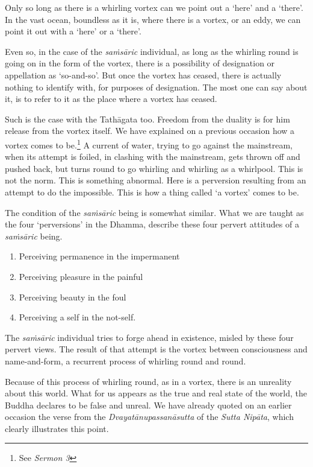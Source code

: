Only so long as there is a whirling vortex can we point out a `here' and a `there'. In the vast ocean, boundless as it is, where there is a vortex, or an eddy, we can point it out with a `here' or a `there'.

Even so, in the case of the \emph{saṁsāric} individual, as long as the whirling round is going on in the form of the vortex, there is a possibility of designation or appellation as `so-and-so'. But once the vortex has ceased, there is actually nothing to identify with, for purposes of designation. The most one can say about it, is to refer to it as the place where a vortex has ceased.

Such is the case with the Tathāgata too. Freedom from the duality is for him release from the vortex itself. We have explained on a previous occasion how a vortex comes to be.\footnote{See \emph{Sermon 3}} A current of water, trying to go against the mainstream, when its attempt is foiled, in clashing with the mainstream, gets thrown off and pushed back, but turns round to go whirling and whirling as a whirlpool. This is not the norm. This is something abnormal. Here is a perversion resulting from an attempt to do the impossible. This is how a thing called `a vortex' comes to be.

The condition of the \emph{saṁsāric} being is somewhat similar. What we are taught as the four `perversions' in the Dhamma, describe these four pervert attitudes of a \emph{saṁsāric} being.

\begin{enumerate}
\def\labelenumi{\arabic{enumi}.}
\tightlist
\item
  Perceiving permanence in the impermanent
\item
  Perceiving pleasure in the painful
\item
  Perceiving beauty in the foul
\item
  Perceiving a self in the not-self.
\end{enumerate}

The \emph{saṁsāric} individual tries to forge ahead in existence, misled by these four pervert views. The result of that attempt is the vortex between consciousness and name-and-form, a recurrent process of whirling round and round.

Because of this process of whirling round, as in a vortex, there is an unreality about this world. What for us appears as the true and real state of the world, the Buddha declares to be false and unreal. We have already quoted on an earlier occasion the verse from the \emph{Dvayatānupassanāsutta} of the \emph{Sutta Nipāta}, which clearly illustrates this point.

